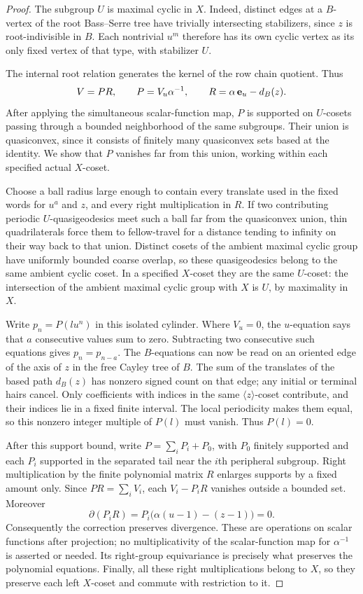 \begin{proof}
The subgroup \(U\) is maximal cyclic in \(X\). Indeed, distinct edges at a
\(B\)-vertex of the root Bass--Serre tree have trivially intersecting
stabilizers, since \(z\) is root-indivisible in \(B\). Each nontrivial
\(u^m\) therefore has its own cyclic vertex as its only fixed vertex of
that type, with stabilizer \(U\).

The internal root relation generates the kernel of the row chain
quotient. Thus
\[
 V=P R,\qquad P=V_u\alpha^{-1},\qquad R=\alpha\,{\bf e}_u-d_B(z).
\]
After applying the simultaneous scalar-function map, \(P\) is supported
on \(U\)-cosets passing through a bounded neighborhood of the same
subgroups. Their union is quasiconvex, since it consists of finitely
many quasiconvex sets based at the identity. We show that \(P\) vanishes
far from this union, working within each specified actual \(X\)-coset.

Choose a ball radius
large enough to contain every translate used in the fixed words for
$u^a$ and $z$, and every right multiplication in $R$. If two
contributing periodic $U$-quasigeodesics meet such a ball far from the
quasiconvex union, thin quadrilaterals force them to fellow-travel for
a distance tending to infinity on their way back to that union.
Distinct cosets of the ambient maximal cyclic group have uniformly
bounded coarse overlap, so these quasigeodesics belong to the same
ambient cyclic coset. In a specified $X$-coset they are the same
$U$-coset: the intersection of the ambient maximal cyclic group with
$X$ is $U$, by maximality in $X$.

Write $p_n=P(lu^n)$ in this isolated cylinder. Where $V_u=0$, the
$u$-equation says that $a$ consecutive values sum to zero. Subtracting
two consecutive such equations gives $p_n=p_{n-a}$. The $B$-equations
can now be read on an oriented edge of the axis of $z$ in the free
Cayley tree of $B$. The sum of the translates of the based path
$d_B(z)$ has nonzero signed count on that edge; any initial or terminal
hairs cancel. Only coefficients with indices in the same
$\langle z\rangle$-coset contribute, and their indices lie in a fixed
finite interval. The local periodicity makes them equal, so this
nonzero integer multiple of $P(l)$ must vanish. Thus $P(l)=0$.

After this support bound, write $P=\sum_i P_i+P_0$, with $P_0$ finitely
supported and each $P_i$ supported in the separated tail near the
$i$th peripheral subgroup. Right multiplication by the finite
polynomial matrix $R$ enlarges supports by a fixed amount only. Since
$PR=\sum_iV_i$, each $V_i-P_iR$ vanishes outside a bounded set.
Moreover
\[
 \partial(P_iR)
 =P_i\bigl(\alpha(u-1)-(z-1)\bigr)=0.
\]
Consequently the correction preserves divergence. These are
operations on scalar functions after projection; no multiplicativity
of the scalar-function map for $\alpha^{-1}$ is asserted or needed.
Its right-group equivariance is precisely what preserves the
polynomial equations. Finally, all these right multiplications belong
to $X$, so they preserve each left $X$-coset and commute with
restriction to it.
\end{proof}

